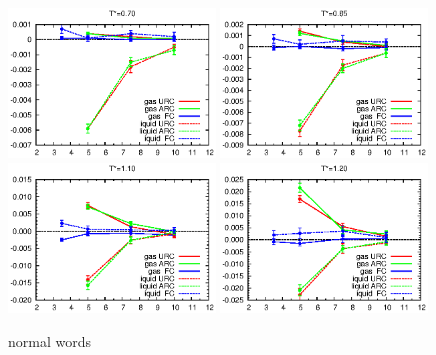 \documentclass[aps,pre,preprint]{revtex4}
\begin{document}
\begin{figure}
  \centering
  \includegraphics[width=0.49\textwidth]{fig/converge/t0.70.eps} 
  \includegraphics[width=0.49\textwidth]{fig/converge/t0.85.eps} 
  \includegraphics[width=0.49\textwidth]{fig/converge/t1.10.eps} 
  \includegraphics[width=0.49\textwidth]{fig/converge/t1.20.eps} 
  \caption{normal words}
  \label{fig:tmp4}
\end{figure}
\end{document}
